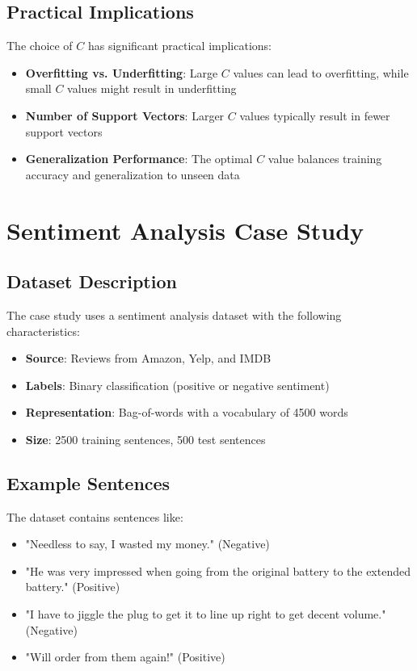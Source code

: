 \documentclass{article}
\begin{document}
\subsection{Practical Implications}
The choice of $C$ has significant practical implications:

\begin{itemize}
    \item \textbf{Overfitting vs. Underfitting}: Large $C$ values can lead to overfitting, while small $C$ values might result in underfitting
    \item \textbf{Number of Support Vectors}: Larger $C$ values typically result in fewer support vectors
    \item \textbf{Generalization Performance}: The optimal $C$ value balances training accuracy and generalization to unseen data
\end{itemize}

\section{Sentiment Analysis Case Study}

\subsection{Dataset Description}
The case study uses a sentiment analysis dataset with the following characteristics:

\begin{itemize}
    \item \textbf{Source}: Reviews from Amazon, Yelp, and IMDB
    \item \textbf{Labels}: Binary classification (positive or negative sentiment)
    \item \textbf{Representation}: Bag-of-words with a vocabulary of 4500 words
    \item \textbf{Size}: 2500 training sentences, 500 test sentences
\end{itemize}

\subsection{Example Sentences}
The dataset contains sentences like:

\begin{itemize}
    \item "Needless to say, I wasted my money." (Negative)
    \item "He was very impressed when going from the original battery to the extended battery." (Positive)
    \item "I have to jiggle the plug to get it to line up right to get decent volume." (Negative)
    \item "Will order from them again!" (Positive)
\end{itemize}
\end{document}
